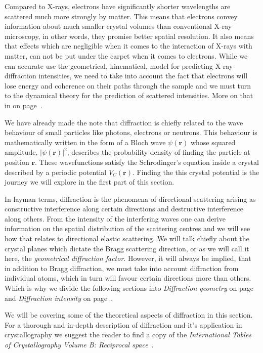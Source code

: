 Compared to X-rays, electrons have significantly shorter wavelengths are scattered much more strongly by matter. This means that electrons convey information about much smaller crystal volumes than conventional X-ray microscopy, in other words, they promise better spatial resolution. It also means that effects which are negligible when it comes to the  interaction of X-rays with matter, can not be put under the carpet when it comes to electrons. While we can accurate use the geometrical, \ie kinematical, model for predicting X-ray diffraction intensities,  we need to take into account the fact that electrons will lose energy and coherence on their paths through the sample and we must turn to the dynamical theory for the prediction of scattered intensities. More on that in on page~\pageref{sec:kinvsDyn}.

We have already made the note that diffraction is chiefly related to the wave behaviour of small particles like photons, electrons or neutrons. This behaviour is mathematically written in the form of a Bloch wave $\psi(\mathbf{r})$ whose squared amplitude, $|\psi(\mathbf{r})|^2$, describes the probability density of finding the particle at position $\mathbf{r}$. These wavefunctions satisfy the Schr{\:o}dinger's equation inside a crystal described by a periodic potential $V_C(\mathbf{r})$. Finding the this crystal potential is the journey we will explore in the first part of this section.

In layman terms, diffraction is the phenomena of directional scattering arising as constructive interference along certain directions and destructive interference along others. From the intensity of the interfering waves one can derive information on the spatial distribution of the scattering centres and we will see how that relates to directional elastic scattering. We will talk chiefly about the crystal planes which dictate the Bragg scattering direction, or as we will call it here, the \textit{geometrical diffraction factor}. However, it will always be implied, that in addition to Bragg diffraction, we must take into account diffraction from individual atoms, which in turn will favour certain directions more than others. Which is why we divide the following sections into \textit{Diffraction geometry} on page~\pageref{sec:geometry} and  \textit{Diffraction intensity} on page~\pageref{sec:intensity}.

We will be covering some of the theoretical aspects of diffraction in this section. For a thorough and in-depth description of diffraction and it's application in crystallography we suggest the reader to find a copy of the \emph{International Tables of Crystallography Volume B: Reciprocal space}~\cite{IntTableCrysBX, IntTableCrysBe}. 


